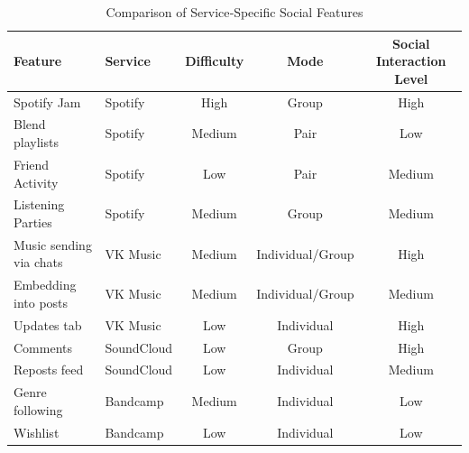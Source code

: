 \begin{table}[ht]
    \centering
    \caption{Comparison of Service‐Specific Social Features}
    \label{tab:social_features}
    \begin{tabular}{|l|l|c|c|c|}
        \hline
        \textbf{Feature}        & \textbf{Service} & \textbf{Difficulty} & \textbf{Mode}    & \textbf{Social Interaction Level} \\
        \hline\hline
        Spotify Jam             & Spotify          & High                & Group            & High                              \\
        \hline
        Blend playlists         & Spotify          & Medium              & Pair             & Low                               \\
        \hline
        Friend Activity         & Spotify          & Low                 & Pair             & Medium                            \\
        \hline
        Listening Parties       & Spotify          & Medium              & Group            & Medium                            \\
        \hline
        Music sending via chats & VK Music         & Medium              & Individual/Group & High                              \\
        \hline
        Embedding into posts    & VK Music         & Medium              & Individual/Group & Medium                            \\
        \hline
        Updates tab             & VK Music         & Low                 & Individual       & High                              \\
        \hline
        Comments                & SoundCloud       & Low                 & Group            & High                              \\
        \hline
        Reposts feed            & SoundCloud       & Low                 & Individual       & Medium                            \\
        \hline
        Genre following         & Bandcamp         & Medium              & Individual       & Low                               \\
        \hline
        Wishlist                & Bandcamp         & Low                 & Individual       & Low                               \\
        \hline
    \end{tabular}
\end{table}



